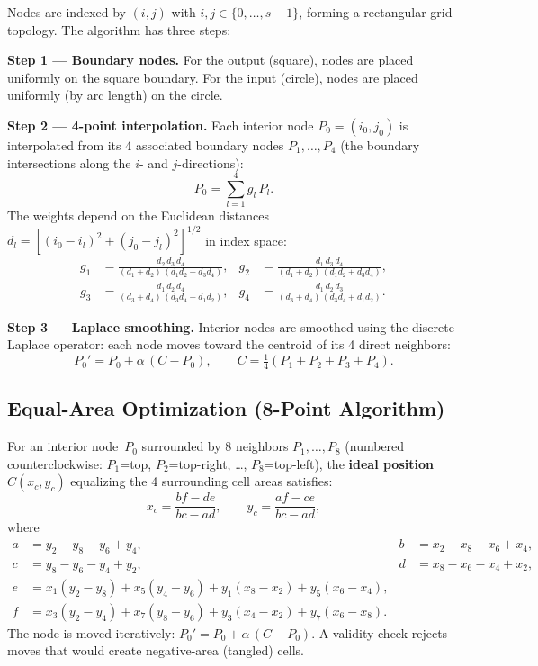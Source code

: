 \documentclass[11pt,a4paper]{article}
\begin{document}
Nodes are indexed by $(i,j)$ with $i,j \in \{0,\ldots,s{-}1\}$, 
forming a rectangular grid topology. The algorithm has three steps:

\textbf{Step 1 --- Boundary nodes.} 
For the output (square), nodes are placed uniformly on the square boundary.
For the input (circle), nodes are placed uniformly (by arc length) on the circle.

\textbf{Step 2 --- 4-point interpolation.}
Each interior node $P_0 = (i_0, j_0)$ is interpolated from its 4 associated 
boundary nodes $P_1,\ldots,P_4$ (the boundary intersections along the $i$- and $j$-directions):
\[
  P_0 = \sum_{l=1}^{4} g_l\, P_l.
\]
The weights depend on the Euclidean distances $d_l = [(i_0{-}i_l)^2 + (j_0{-}j_l)^2]^{1/2}$ 
in index space:
\begin{align*}
  g_1 &= \frac{d_2\, d_3\, d_4}{(d_1+d_2)\,(d_1 d_2 + d_3 d_4)}, &
  g_2 &= \frac{d_1\, d_3\, d_4}{(d_1+d_2)\,(d_1 d_2 + d_3 d_4)}, \\[4pt]
  g_3 &= \frac{d_1\, d_2\, d_4}{(d_3+d_4)\,(d_3 d_4 + d_1 d_2)}, &
  g_4 &= \frac{d_1\, d_2\, d_3}{(d_3+d_4)\,(d_3 d_4 + d_1 d_2)}.
\end{align*}

\textbf{Step 3 --- Laplace smoothing.}
Interior nodes are smoothed using the discrete Laplace operator: 
each node moves toward the centroid of its 4 direct neighbors:
\[
  P_0' = P_0 + \alpha\,(C - P_0), \qquad
  C = \tfrac{1}{4}(P_1 + P_2 + P_3 + P_4).
\]

\subsection{Equal-Area Optimization (8-Point Algorithm)}

For an interior node~$P_0$ surrounded by 8 neighbors $P_1,\ldots,P_8$ 
(numbered counterclockwise: $P_1$=top, $P_2$=top-right, \ldots, $P_8$=top-left), 
the \textbf{ideal position} $C(x_c,y_c)$ equalizing the 4 surrounding cell areas satisfies:
\[
  x_c = \frac{bf - de}{bc - ad}, \qquad y_c = \frac{af - ce}{bc - ad},
\]
where
\begin{align*}
  a &= y_2 - y_8 - y_6 + y_4, & b &= x_2 - x_8 - x_6 + x_4, \\
  c &= y_8 - y_6 - y_4 + y_2, & d &= x_8 - x_6 - x_4 + x_2, \\
  e &= x_1(y_2{-}y_8) + x_5(y_4{-}y_6) + y_1(x_8{-}x_2) + y_5(x_6{-}x_4), \\
  f &= x_3(y_2{-}y_4) + x_7(y_8{-}y_6) + y_3(x_4{-}x_2) + y_7(x_6{-}x_8).
\end{align*}
The node is moved iteratively: $P_0' = P_0 + \alpha\,(C - P_0)$.
A validity check rejects moves that would create negative-area (tangled) cells.
\end{document}
